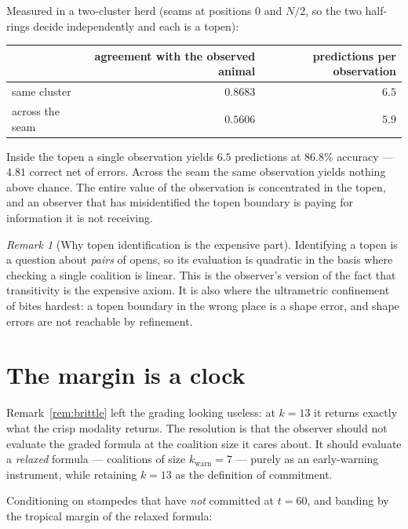 \documentclass[11pt,a4paper]{article}
\theoremstyle{plain}
\theoremstyle{definition}
\theoremstyle{remark}
\newtheorem{remark}[theorem]{Remark}
\begin{document}
Measured in a two-cluster herd (seams at positions $0$ and $N/2$, so the two
half-rings decide independently and each is a topen):

\begin{center}
\begin{tabular}{@{}lrr@{}}
\toprule
 & agreement with the observed animal & predictions per observation\\
\midrule
same cluster & $0.8683$ & $6.5$\\
across the seam & $0.5606$ & $5.9$\\
\bottomrule
\end{tabular}
\end{center}

Inside the topen a single observation yields $6.5$ predictions at $86.8\%$
accuracy --- $4.81$ correct net of errors. Across the seam the same observation
yields nothing above chance. The entire value of the observation is
concentrated in the topen, and an observer that has misidentified the topen
boundary is paying for information it is not receiving.

\begin{remark}[Why topen identification is the expensive part]
Identifying a topen is a question about \emph{pairs} of opens, so its evaluation
is quadratic in the basis where checking a single coalition is linear. This is
the observer's version of the fact that transitivity is the expensive axiom.
It is also where the ultrametric confinement of
\cite[Prop.~Confinement]{scientist} bites hardest: a topen boundary in the wrong
place is a shape error, and shape errors are not reachable by refinement.
\end{remark}

\section{The margin is a clock}\label{sec:clock}

Remark~\ref{rem:brittle} left the grading looking useless: at $k = 13$ it
returns exactly what the crisp modality returns. The resolution is that the
observer should not evaluate the graded formula at the coalition size it cares
about. It should evaluate a \emph{relaxed} formula --- coalitions of size
$k_{\mathrm{warn}} = 7$ --- purely as an early-warning instrument, while
retaining $k = 13$ as the definition of commitment.

Conditioning on stampedes that have \emph{not} committed at $t = 60$, and
banding by the tropical margin of the relaxed formula:
\end{document}
